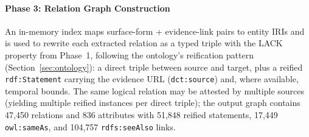 %
\vspace{-0.3cm}
\paragraph{Phase 3: Relation Graph Construction}
\label{sec:construction:relations}
An in-memory index maps surface-form + evidence-link pairs to entity IRIs and is used to rewrite each extracted relation as a typed triple with the LACK property from Phase~1, following the ontology's reification pattern (Section~\ref{sec:ontology}): a direct triple between source and target, plus a reified \texttt{rdf:Statement} carrying the evidence URL (\texttt{dct:source}) and, where available, temporal bounds.
The same logical relation may be attested by multiple sources (yielding multiple reified instances per direct triple); the output graph contains 47,450 relations and 836 attributes with 51,848 reified statements, 17,449 \texttt{owl:sameAs}, and 104,757 \texttt{rdfs:seeAlso} links.

